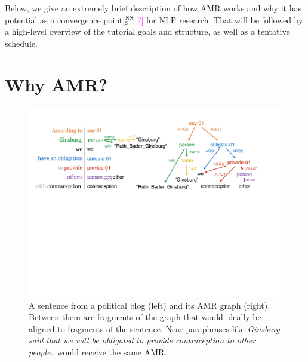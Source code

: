 \documentclass[11pt,letterpaper]{article}
\newcommand{\ensuretext}[1]{#1}
\newcommand{\nssmarker}{\ensuretext{\textcolor{magenta}{\ensuremath{^{\textsc{NS}}_{\textsc{S}}}}}}
\newcommand{\arkcomment}[3]{\ensuretext{\textcolor{#3}{[#1 #2]}}}
\newcommand{\nss}[1]{\arkcomment{\nssmarker}{#1}{magenta}}
\begin{document}
Below, we give an extremely brief description of how AMR works and why it has potential 
as a convergence point\nss{?} for NLP research. 
That will be followed by a high-level overview of the tutorial goals and structure, 
as well as a tentative schedule.

\section{Why AMR?}


\begin{figure}\centering
\includegraphics[width=.87\textwidth]{ginsburg.pdf}
\caption{A sentence from a political blog (left) and its AMR graph (right). 
Between them are fragments of the graph that would ideally be aligned to fragments of the sentence. 
Near-paraphrases like \textit{Ginsburg said that we will be obligated to provide contraception to other people.}\ 
would receive the same AMR.}
\label{fig:ginsburg}
\end{figure}
\end{document}

